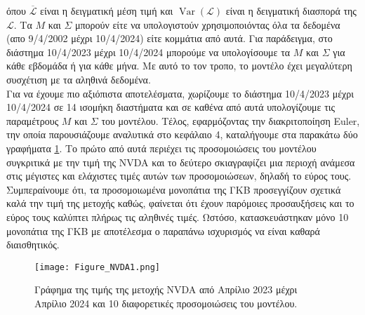 \documentclass[12pt,a4paper,twoside,openany]{book}
\begin{document}
	όπου $\overline{\mathcal{L}}$ είναι η δειγματική μέση τιμή και $\operatorname{Var}(\mathcal{L})$ είναι η δειγματική διασπορά της $\mathcal{L}$. Τα $M$ και $\Sigma$ μπορούν είτε να υπολογιστούν χρησιμοποιόντας όλα τα δεδομένα (απο 9/4/2002 μέχρι 10/4/2024) είτε κομμάτια από αυτά. Για παράδειγμα, στο διάστημα 10/4/2023 μέχρι 10/4/2024 μπορούμε να υπολογίσουμε τα $M$ και $\Sigma$ για κάθε εβδομάδα ή για κάθε μήνα. Με αυτό το τον τροπο, το μοντέλο έχει μεγαλύτερη συσχέτιση με τα αληθινά δεδομένα.
	\vspace{2.5mm}\\
	Για να έχουμε πιο αξιόπιστα αποτελέσματα, χωρίζουμε το διάστημα 10/4/2023 μέχρι 10/4/2024 σε 14 ισομήκη διαστήματα και σε καθένα από αυτά υπολογίζουμε τις παραμέτρους $M$ και $\Sigma$ του μοντέλου. Τέλος, εφαρμόζοντας την διακριτοποίηση Euler, την οποία παρουσιάζουμε αναλυτικά στο κεφάλαιο 4, καταλήγουμε στα παρακάτω δύο γραφήματα \ref{fig:NVDA}. Το πρώτο από αυτά περιέχει τις προσομοιώσεις του μοντέλου συγκριτικά με την τιμή της NVDA και το δεύτερο σκιαγραφίζει μια περιοχή ανάμεσα στις μέγιστες και ελάχιστες τιμές αυτών των προσομοιώσεων, δηλαδή το εύρος τους. Συμπεραίνουμε ότι, τα προσομοιωμένα μονοπάτια της ΓΚΒ προσεγγίζουν σχετικά καλά την τιμή της μετοχής καθώς, φαίνεται ότι έχουν παρόμοιες προσαυξήσεις και το εύρος τους καλύπτει πλήρως τις αληθινές τιμές. Ωστόσο, κατασκευάστηκαν μόνο 10 μονοπάτια της ΓΚΒ με αποτέλεσμα ο παραπάνω ισχυρισμός να είναι καθαρά διαισθητικός.
	\vspace{2.5mm}\\

	\begin{figure}[h]
		\centering
		\texttt{[image: Figure\_NVDA1.png]}
		\caption{Γράφημα της τιμής της μετοχής NVDA από Απρίλιο 2023 μέχρι Απρίλιο 2024 και 10 διαφορετικές προσομοιώσεις του μοντέλου.}
		\label{fig:NVDA}
	\end{figure}
	
\end{document}
